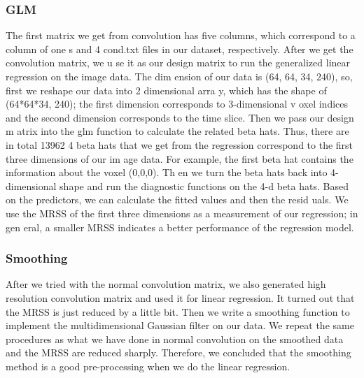 \subsubsection {GLM}
The first matrix we get from convolution has five columns, which correspond to a column of one
s and 4 cond.txt files in our dataset, respectively. After we get the convolution matrix, we u
se it as our design matrix to run the generalized linear regression on the image data. The dim
ension of our data is (64, 64, 34, 240), so, first we reshape our data into 2 dimensional arra
y, which has the shape of (64*64*34, 240); the first dimension corresponds to 3-dimensional v
oxel indices and the second dimension corresponds to the time slice. Then we pass our design m
atrix into the glm function to calculate the related beta hats. Thus, there are in total 13962
4 beta hats that we get from the regression correspond to the first three dimensions of our im
age data. For example, the first beta hat contains the information about the voxel (0,0,0). Th
en we turn the beta hats back into 4-dimensional shape and run the diagnostic functions on the
 4-d beta hats. Based on the predictors, we can calculate the fitted values and then the resid
 uals. We use the MRSS of the first three dimensions as a measurement of our regression; in gen
 eral, a smaller MRSS indicates a better performance of the regression model. 

\subsubsection {Smoothing}
After we tried with the normal convolution matrix, we also generated high resolution convolution 
matrix and used it for linear regression. It turned out that the MRSS is just reduced by a little
 bit. Then we write a smoothing function to implement the multidimensional Gaussian filter on our
  data. We repeat the same procedures as what we have done in normal convolution on the smoothed 
  data and the MRSS are reduced sharply. Therefore, we concluded that the smoothing method is a 
  good pre-processing when we do the linear regression. 

